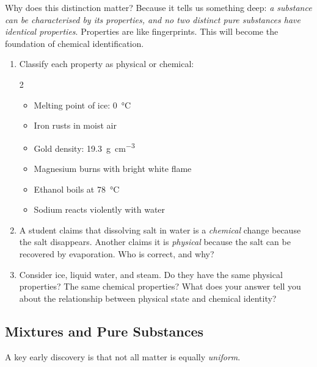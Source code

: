 \documentclass[12pt, a4paper]{book}
\theoremstyle{definition}
\begin{document}
\vspace{0.5em}

Why does this distinction matter?
Because it tells us something deep:
\emph{a substance can be characterised by its properties,
and no two distinct pure substances have identical properties}.
Properties are like fingerprints.
This will become the foundation of chemical identification.

\begin{problembox}
\begin{enumerate}[label=\textbf{\arabic*.}]
  \item Classify each property as physical or chemical:
    \begin{multicols}{2}
    \begin{itemize}[nosep]
      \item Melting point of ice: \SI{0}{\celsius}
      \item Iron rusts in moist air
      \item Gold density: \SI{19.3}{\gram\per\centi\metre\cubed}
      \item Magnesium burns with bright white flame
      \item Ethanol boils at \SI{78}{\celsius}
      \item Sodium reacts violently with water
    \end{itemize}
    \end{multicols}

  \item A student claims that dissolving salt in water is a
        \emph{chemical} change because the salt disappears.
        Another claims it is \emph{physical} because the salt
        can be recovered by evaporation.
        Who is correct, and why?

  \item Consider ice, liquid water, and steam.
        Do they have the same physical properties?
        The same chemical properties?
        What does your answer tell you about the
        relationship between physical state and chemical identity?
\end{enumerate}
\end{problembox}

\subsection{Mixtures and Pure Substances}

A key early discovery is that not all matter is equally \emph{uniform}.
\end{document}
